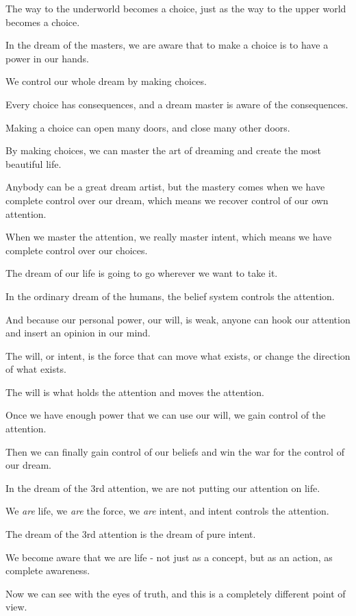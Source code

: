 \documentclass{article}
\numberwithin{equation}{section}
\begin{document}
The way to the underworld becomes a choice, just as the way to the upper world becomes a choice.

%
In the dream of the masters, we are aware that to make a choice is to have a power in our hands.

We control our whole dream by making choices.

Every choice has consequences, and a dream master is aware of the consequences.

Making a choice can open many doors, and close many other doors.


By making choices, we can master the art of dreaming and create the most beautiful life.

%
Anybody can be a great dream artist, but the mastery comes when we have complete control over our dream, which means we recover control of our own attention.

When we master the attention, we really master intent, which means we have complete control over our choices.

The dream of our life is going to go wherever we want to take it.

%
In the ordinary dream of the humans, the belief system controls the attention.

And because our personal power, our will, is weak, anyone can hook our attention and insert an opinion in our mind.

The will, or intent, is the force that can move what exists, or change the direction of what exists.

The will is what holds the attention and moves the attention.

Once we have enough power that we can use our will, we gain control of the attention.

Then we can finally gain control of our beliefs and win the war for the control of our dream.

%
In the dream of the 3rd attention, we are not putting our attention on life.

We \textit{are} life, we \textit{are} the force, we \textit{are} intent, and intent controls the attention.

The dream of the 3rd attention is the dream of pure intent.

We become aware that we are life - not just as a concept, but as an action, as complete awareness.

Now we can see with the eyes of truth, and this is a completely different point of view.
\end{document}

